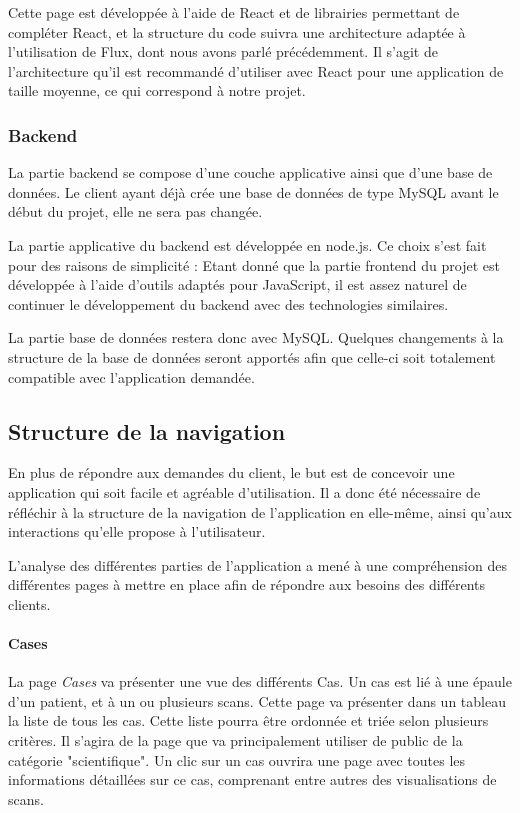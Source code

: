 		Cette page est développée à l'aide de React et de librairies permettant de compléter React, et la structure du code suivra une architecture adaptée à l'utilisation de Flux, dont nous avons parlé précédemment. Il s'agit de l'architecture qu'il est recommandé d'utiliser avec React pour une application de taille moyenne, ce qui correspond à notre projet.

	\subsubsection{Backend}

		La partie backend se compose d'une couche applicative ainsi que d'une base de données. Le client ayant déjà crée une base de données de type MySQL avant le début du projet, elle ne sera pas changée.

		La partie applicative du backend est développée en node.js. Ce choix s'est fait pour des raisons de simplicité : Etant donné que la partie frontend du projet est développée à l'aide d'outils adaptés pour JavaScript, il est assez naturel de continuer le développement du backend avec des technologies similaires.

		La partie base de données restera donc avec MySQL. Quelques changements à la structure de la base de données seront apportés afin que celle-ci soit totalement compatible avec l'application demandée.

	\subsection{Structure de la navigation}

		En plus de répondre aux demandes du client, le but est de concevoir une application qui soit facile et agréable d'utilisation.
		Il a donc été nécessaire de réfléchir à la structure de la navigation de l'application en elle-même, ainsi qu'aux interactions qu'elle propose à l'utilisateur.

		L'analyse des différentes parties de l'application a mené à une compréhension des différentes pages à mettre en place afin de répondre aux besoins des différents clients.

		\paragraph{Cases} La page \textit{Cases} va présenter une vue des différents Cas. Un cas est lié à une épaule d'un patient, et à un ou plusieurs scans. Cette page va présenter dans un tableau la liste de tous les cas. Cette liste pourra être ordonnée et triée selon plusieurs critères. Il s'agira de la page que va principalement utiliser de public de la catégorie "scientifique". Un clic sur un cas ouvrira une page avec toutes les informations détaillées sur ce cas, comprenant entre autres des visualisations de scans.
